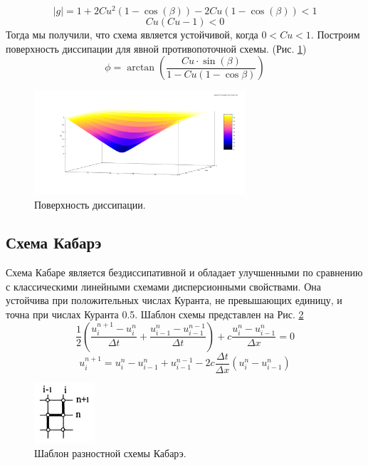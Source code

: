 \begin{equation}
    |g|=1+2Cu^2(1-\cos(\beta))-2Cu(1-\cos(\beta))<1
\end{equation}
\begin{equation}
    Cu(Cu-1)<0
\end{equation}
Тогда мы получили, что схема является устойчивой, когда $0<Cu<1$. Построим поверхность диссипации для явной противопоточной схемы. (Рис. \ref{fig:12})
\begin{equation}
    \phi=\arctan(\frac{Cu\cdot \sin(\beta)}{1-Cu(1-\cos{\beta})})
\end{equation}
\begin{figure}[H]
    \centering
    \includegraphics[width=0.7\textwidth]{images/14.png}
    \caption{Поверхность диссипации.}
    \label{fig:12}
\end{figure}



\subsection{Схема Кабарэ}
Схема Кабаре является бездиссипативной и обладает улучшенными по сравнению с
классическими линейными схемами дисперсионными свойствами. Она устойчива при положительных числах Куранта, не превышающих единицу, и точна при числах Куранта 0.5. Шаблон схемы представлен на Рис. \ref{fig:10}
\begin{equation}
    \frac{1}{2}\left(\frac{u_i^{n+1}-u_i^n}{\Delta t}+\frac{u_{i-1}^{n}-u_{i-1}^{n-1}}{\Delta t}\right) +c \frac{u_i^{n}-u_{i-1}^n}{\Delta x}=0
\end{equation}
\begin{equation}
    u^{n+1}_i=u^n_i-u^n_{i-1}+u^{n-1}_{i-1}-2c\frac{\Delta t}{\Delta x}(u^n_i-u^n_{i-1})
\end{equation}
\begin{figure}[H]
    \centering
    \includegraphics[width=0.2\textwidth]{images/11.png}
    \caption{Шаблон разностной схемы Кабарэ.}
    \label{fig:10}
\end{figure}

